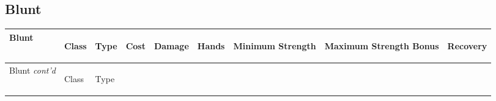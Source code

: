 \documentclass[twoside]{book}
\begin{document}
\hspace{-2ex}

\vspace{1ex}
    
    

\subsection{Blunt}
    
\begin{longtable}{p{1.25in}llllp{2em}p{3em}p{3em}l} 
  Blunt
  &
  \begin{turn}{70}{Class}\end{turn}
          
  &
  \begin{turn}{70}{Type}\end{turn}
          
  &
  \begin{turn}{70}{Cost}\end{turn}
          
  &
  \begin{turn}{70}{Damage}\end{turn}
          
  &
  \begin{turn}{70}{Hands}\end{turn}
          
  &
  \begin{turn}{70}{Minimum Strength}\end{turn}
          
  &
  \begin{turn}{70}{Maximum Strength Bonus}\end{turn}
          
  &
  \begin{turn}{70}{Recovery}\end{turn}
          
  \\
  \hline
  \hline
  \endfirsthead
  Blunt \textit{cont'd}
        
  &
  \begin{turn}{70}{Class}\end{turn}
          
  &
  \begin{turn}{70}{Type}\end{turn}
          

\end{longtable}
\end{document}
